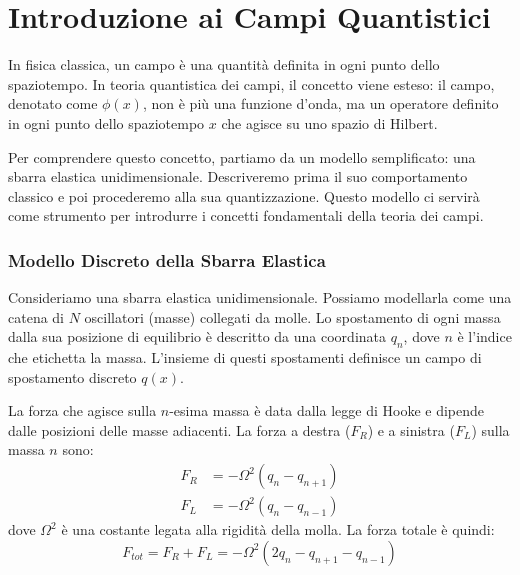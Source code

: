 \section{Introduzione ai Campi Quantistici}

In fisica classica, un campo è una quantità definita in ogni punto dello spaziotempo. In teoria quantistica dei campi, il concetto viene esteso: il campo, denotato come $\phi(x)$, non è più una funzione d'onda, ma un operatore  definito in ogni punto dello spaziotempo $x$ che agisce su uno spazio di Hilbert.

Per comprendere questo concetto, partiamo da un modello semplificato: una sbarra elastica unidimensionale. Descriveremo prima il suo comportamento classico e poi procederemo alla sua quantizzazione. Questo modello ci servirà come strumento per introdurre i concetti fondamentali della teoria dei campi.

\subsubsection{Modello Discreto della Sbarra Elastica}

Consideriamo una sbarra elastica unidimensionale. Possiamo modellarla come una catena di $N$ oscillatori (masse) collegati da molle. Lo spostamento di ogni massa dalla sua posizione di equilibrio è descritto da una coordinata $q_n$, dove $n$ è l'indice che etichetta la massa. L'insieme di questi spostamenti definisce un campo di spostamento discreto  $q(x)$.

La forza che agisce sulla $n$-esima massa è data dalla legge di Hooke e dipende dalle posizioni delle masse adiacenti. La forza a destra ($F_R$) e a sinistra ($F_L$) sulla massa $n$ sono:
\begin{align}
    F_R &= -\Omega^2(q_n - q_{n+1}) \\
    F_L &= -\Omega^2(q_n - q_{n-1})
\end{align}
dove $\Omega^2$ è una costante legata alla rigidità della molla. La forza totale è quindi:
\begin{equation}
    F_{tot} = F_R + F_L = -\Omega^2(2q_n - q_{n+1} - q_{n-1})
\end{equation}





